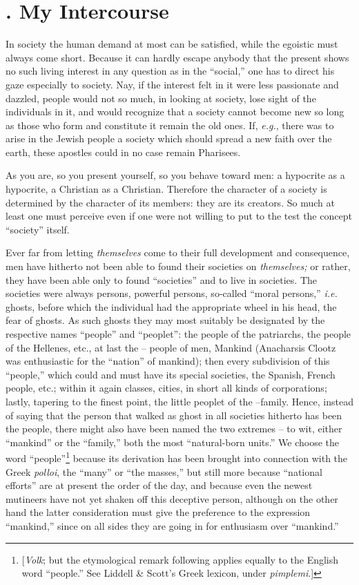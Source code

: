\documentclass[12pt,a4paper]{book}
\begin{document}
\section[2. My Intercourse]{. My Intercourse}

In society the human demand at most can be satisfied, while the egoistic must 
always come short. Because it can hardly escape anybody that the present shows 
no such living interest in any question as in the ``social,'' one has to 
direct his gaze especially to society. Nay, if the interest felt in it were 
less passionate and dazzled, people would not so much, in looking at society, 
lose sight of the individuals in it, and would recognize that a society cannot 
become new so long as those who form and constitute it remain the old ones. 
If, \textit{e.g.}, there was to arise in the Jewish people a society which 
should spread a new faith over the earth, these apostles could in no case 
remain Pharisees.

As you are, so you present yourself, so you behave toward men: a hypocrite as 
a hypocrite, a Christian as a Christian. Therefore the character of a society 
is determined by the character of its members: they are its creators. So much 
at least one must perceive even if one were not willing to put to the test the 
concept ``society'' itself.

Ever far from letting \textit{themselves} come to their full development and 
consequence, men have hitherto not been able to found their societies on 
\textit{themselves;} or rather, they have been able only to found 
``societies'' and to live in societies. The societies were always persons, 
powerful persons, so-called ``moral persons,'' \textit{i.e.} ghosts, before 
which the individual had the appropriate wheel in his head, the fear of 
ghosts. As such ghosts they may most suitably be designated by the respective 
names ``people'' and ``peoplet'': the people of the patriarchs, the people 
of the Hellenes, etc., at last the -- people of men, Mankind (Anacharsis 
Clootz was enthusiastic for the ``nation'' of mankind); then every 
subdivision of this ``people,'' which could and must have its special 
societies, the Spanish, French people, etc.; within it again classes, cities, 
in short all kinds of corporations; lastly, tapering to the finest point, the 
little peoplet of the --family. Hence, instead of saying that the person that 
walked as ghost in all societies hitherto has been the people, there might 
also have been named the two extremes -- to wit, either ``mankind'' or the 
``family,'' both the most ``natural-born units.'' We choose the word 
``people''\footnote{[\textit{Volk}; but the etymological remark following 
applies equally to the English word ``people.'' See Liddell \& Scott's Greek 
lexicon, under \textit{pimplemi}.]} because its derivation has been brought 
into connection with the Greek \textit{polloi}, the ``many'' or ``the 
masses,'' but still more because ``national efforts'' are at present the 
order of the day, and because even the newest mutineers have not yet shaken 
off this deceptive person, although on the other hand the latter consideration 
must give the preference to the expression ``mankind,'' since on all sides 
they are going in for enthusiasm over ``mankind.''
\end{document}
